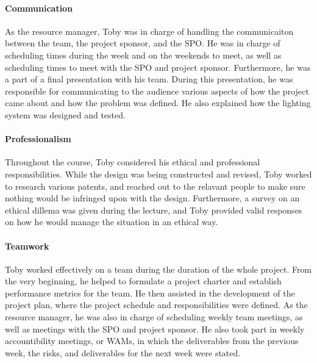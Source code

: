 \documentclass[../../main.tex]{subfiles}
\begin{document}
\paragraph{Communication}
\par As the resource manager, Toby was in charge of handling the communicaiton between the team, the project sponsor, and the SPO. He was in charge of scheduling times during the week and on the weekends to meet, as well as scheduling times to meet with the SPO and project sponsor. Furthermore, he was a part of a final presentation with his team. During this presentation, he was responsible for communicating to the audience various aspects of how the project came about and how the problem was defined. He also explained how the lighting system was designed and tested.

\paragraph{Professionalism}
\par Throughout the course, Toby considered his ethical and professional responsibilities. While the design was being constructed and revised, Toby worked to research various patents, and reached out to the relavant people to make sure nothing would be infringed upon with the design. Furthermore, a survey on an ethical dillema was given during the lecture, and Toby provided valid responses on how he would manage the situation in an ethical way.


\paragraph{Teamwork}
\par Toby worked effectively on a team during the duration of the whole project. From the very beginning, he helped to formulate a project charter and establish performance metrics for the team. He then assisted in the development of the project plan, where the project schedule and responsibilities were defined. As the resource manager, he was also in charge of scheduling weekly team meetings, as well as meetings with the SPO and project sponsor. He also took part in weekly accountibility meetings, or WAMs, in which the deliverables from the previous week, the risks, and deliverables for the next week were stated. 
\end{document}
